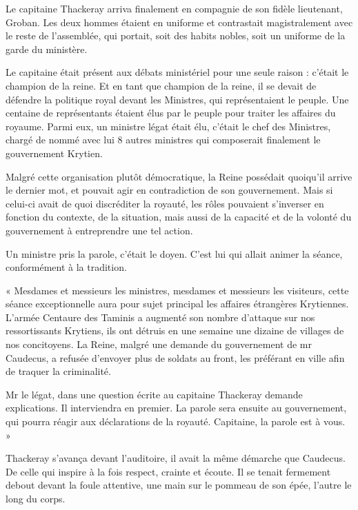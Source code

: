\documentclass{book}
\begin{document}
Le capitaine Thackeray arriva finalement en compagnie de son fidèle lieutenant, Groban. Les deux hommes étaient en uniforme et contrastait magistralement avec le reste de l'assemblée, qui portait, soit des habits nobles, soit un uniforme de la garde du ministère.\newline

Le capitaine était présent aux débats ministériel pour une seule raison : c'était le champion de la reine. Et en tant que champion de la reine, il se devait de défendre la politique royal devant les Ministres, qui représentaient le peuple. Une centaine de représentants étaient élus par le peuple pour traiter les affaires du royaume. Parmi eux, un ministre légat était élu, c'était le chef des Ministres, chargé de nommé avec lui 8 autres ministres qui composerait finalement le gouvernement Krytien.\newline

Malgré cette organisation plutôt démocratique, la Reine possédait quoiqu'il arrive le dernier mot, et pouvait agir en contradiction de son gouvernement. Mais si celui-ci avait de quoi discréditer la royauté, les rôles pouvaient s'inverser en fonction du contexte, de la situation, mais aussi de la capacité et de la volonté du gouvernement à entreprendre une tel action.\newline

Un ministre pris la parole, c'était le doyen. C'est lui qui allait animer la séance, conformément à la tradition.\newline

« Mesdames et messieurs les ministres, mesdames et messieurs les visiteurs, cette séance exceptionnelle aura pour sujet principal les affaires étrangères Krytiennes. L'armée Centaure des Taminis a augmenté son nombre d'attaque sur nos ressortissants Krytiens, ils ont détruis en une semaine une dizaine de villages de nos concitoyens. La Reine, malgré une demande du gouvernement de mr Caudecus, a refusée d'envoyer plus de soldats au front, les préférant en ville afin de traquer la criminalité.

Mr le légat, dans une question écrite au capitaine Thackeray demande explications. Il interviendra en premier. La parole sera ensuite au gouvernement, qui pourra réagir aux déclarations de la royauté. Capitaine, la parole est à vous. »\newline

Thackeray s'avança devant l'auditoire, il avait la même démarche que Caudecus. De celle qui inspire à la fois respect, crainte et écoute. Il se tenait fermement debout devant la foule attentive, une main sur le pommeau de son épée, l'autre le long du corps.\newline
\end{document}
